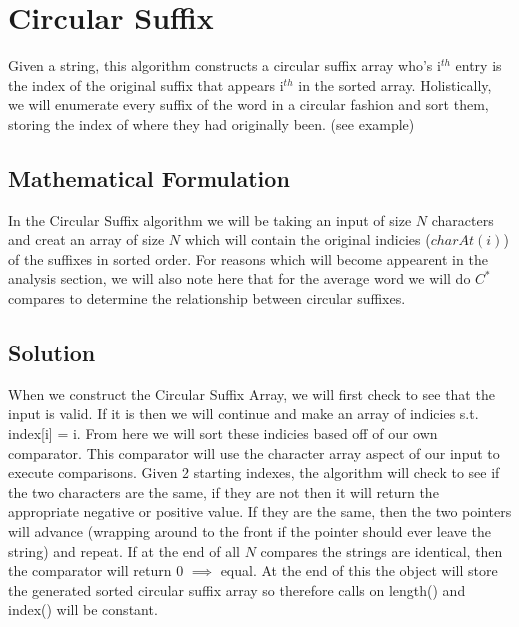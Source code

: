 \documentclass[12pt]{article}
\begin{document}


\newpage%



\section{Circular Suffix}
Given a string, this algorithm constructs a circular suffix array who's i$^{th}$ entry
is the index of the original suffix that appears i$^{th}$ in the sorted array.
Holistically, we will enumerate every suffix of the word in a circular fashion and sort
them, storing the index of where they had originally been. (see example)


\subsection{Mathematical Formulation}
In the Circular Suffix algorithm we will be taking an input of size $N$ characters
and creat an array of size $N$ which will contain the original indicies ($charAt(i)$)
of the suffixes in sorted order. For reasons which will become appearent in the analysis
section, we will also note here that for the average word we will do $C^{\ast}$ compares
to determine the relationship between circular suffixes.


\subsection{Solution}
When we construct the Circular Suffix Array, we will first check to see that the
input is valid.  If it is then we will continue and make an array of indicies
s.t. index[i] = i.  From here we will sort these indicies based off of our own
comparator. This comparator will use the character array aspect of our input to
execute comparisons. Given 2 starting indexes, the algorithm will check to see
if the two characters are the same, if they are not then it will return the
appropriate negative or positive value.  If they are the same, then the two
pointers will advance (wrapping around to the front if the pointer should ever
leave the string) and repeat.  If at the end of all $N$ compares the strings are
identical, then the comparator will return 0 $\implies$ equal. At the end of this
the object will store the generated sorted circular suffix array so therefore
calls on length() and index() will be constant.
\end{document}
